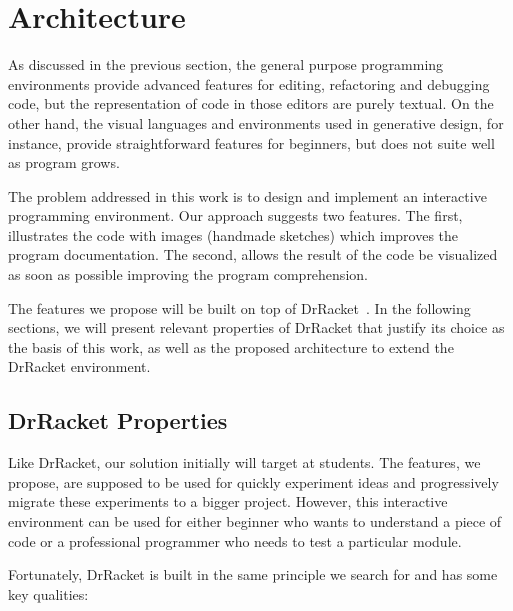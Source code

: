 
% 
% 

\section{Architecture}
\label{sec:arch}

As discussed in the previous section, the general purpose programming environments provide advanced features for editing, refactoring and debugging code, but the representation of code in those editors are purely textual. On the other hand, the visual languages and environments used in generative design, for instance, provide straightforward features for beginners, but does not suite well as program grows.

The problem addressed in this work is to design and implement an interactive programming environment. Our approach suggests two features. The first, illustrates the code with images (handmade sketches) which improves the program documentation. The second, allows the result of the code be visualized as soon as possible improving the program comprehension.

The features we propose will be built on top of DrRacket~\cite{findler2002drscheme}. In the following sections, we will present relevant properties of DrRacket that justify its choice as the basis of this work, as well as the proposed architecture to extend the DrRacket environment.

\subsection{DrRacket Properties}

Like DrRacket, our solution initially will target at students. The features, we propose, are supposed to be used for quickly experiment ideas and progressively migrate these experiments to a bigger project. However, this interactive environment can be used for either beginner who wants to understand a piece of code or a professional programmer who needs to test a particular module.

Fortunately, DrRacket is built in the same principle we search for and has some key qualities:

